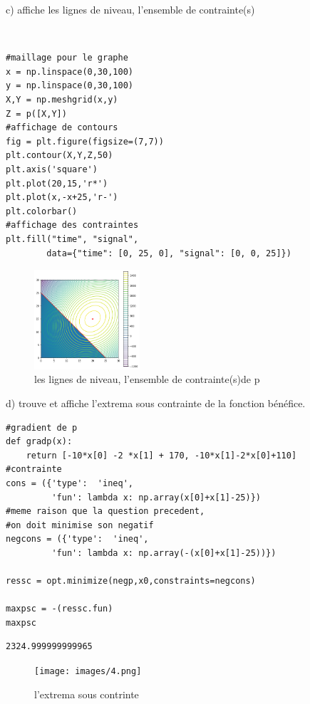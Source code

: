 \documentclass[12pt]{report}
\begin{document}
\begin{flushleft}
c) affiche les lignes de niveau, l’ensemble de contrainte(s)  \end{flushleft}\\
\begin{lstlisting}
#maillage pour le graphe
x = np.linspace(0,30,100)
y = np.linspace(0,30,100)
X,Y = np.meshgrid(x,y)
Z = p([X,Y])
#affichage de contours
fig = plt.figure(figsize=(7,7))
plt.contour(X,Y,Z,50)
plt.axis('square')
plt.plot(20,15,'r*')
plt.plot(x,-x+25,'r-')
plt.colorbar()
#affichage des contraintes
plt.fill("time", "signal", 
        data={"time": [0, 25, 0], "signal": [0, 0, 25]})
\end{lstlisting}

\begin{figure}[htb]
    \caption{les lignes de niveau, l’ensemble de contrainte(s)de p}
    \begin{center}
        \includegraphics[width=0.35\textwidth]{images/3.png}
    \end{center}
    \label{}
\end{figure}

\begin{flushleft}
    d) trouve et affiche l'extrema sous contrainte de la fonction bénéfice.  
\end{flushleft}

\begin{lstlisting}
#gradient de p
def gradp(x):
    return [-10*x[0] -2 *x[1] + 170, -10*x[1]-2*x[0]+110]
#contrainte
cons = ({'type':  'ineq',
         'fun': lambda x: np.array(x[0]+x[1]-25)})
#meme raison que la question precedent,
#on doit minimise son negatif
negcons = ({'type':  'ineq',
         'fun': lambda x: np.array(-(x[0]+x[1]-25))})

ressc = opt.minimize(negp,x0,constraints=negcons)

maxpsc = -(ressc.fun)
maxpsc
\end{lstlisting}
\begin{lstlisting}
2324.999999999965
\end{lstlisting}

\begin{figure}[htb]
    \caption{l'extrema sous contrinte }
    \begin{center}
        \texttt{[image: images/4.png]}
    \end{center}
    \label{}
\end{figure}
\end{document}

